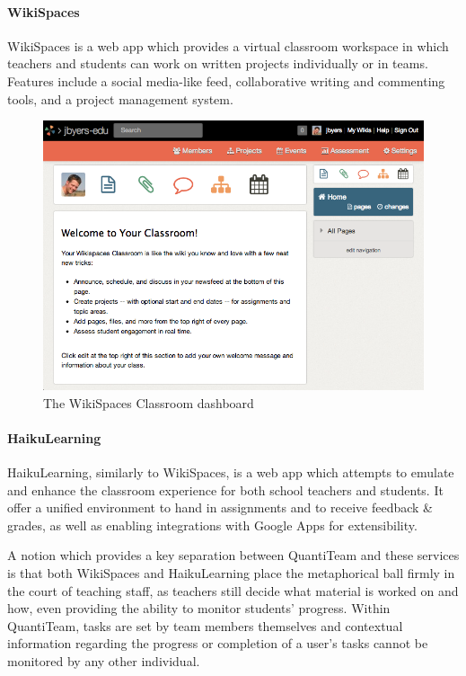\documentclass[12pt]{report}
\let\oldparagraph\paragraph
\renewcommand{\paragraph}[1]{\oldparagraph{#1}\mbox{}}
\begin{document}
\paragraph{WikiSpaces}\label{wikispaces}

WikiSpaces\cite{1wikispaces} is a web app which provides a virtual classroom workspace in
which teachers and students can work on written projects individually or
in teams. Features include a social media-like feed, collaborative
writing and commenting tools, and a project management system.

\begin{figure}[htbp]
\centering
\includegraphics{../screenshots/wikispaces.png}
\caption{The WikiSpaces Classroom dashboard}
\end{figure}

\paragraph{HaikuLearning}\label{haikulearning}

HaikuLearning\cite{haikulearning}, similarly to WikiSpaces, is a web app which attempts to
emulate and enhance the classroom experience for both school teachers
and students. It offer a unified environment to hand in assignments and
to receive feedback \& grades, as well as enabling integrations with
Google Apps for extensibility.

A notion which provides a key separation between QuantiTeam and these
services is that both WikiSpaces and HaikuLearning place the
metaphorical ball firmly in the court of teaching staff, as teachers
still decide what material is worked on and how, even providing the
ability to monitor students' progress. Within QuantiTeam, tasks are set
by team members themselves and contextual information regarding the
progress or completion of a user's tasks cannot be monitored by any
other individual.
\end{document}
